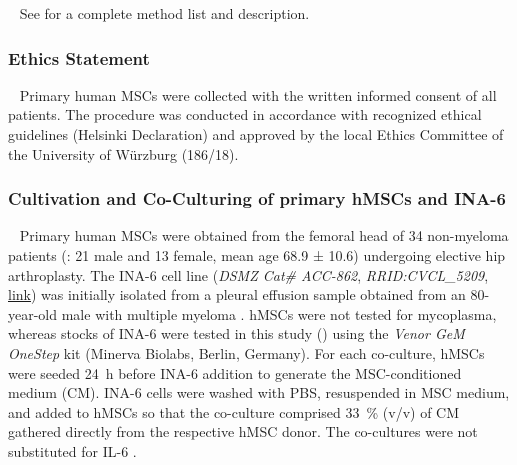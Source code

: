 \newpage


\label{C1:methods}
\ %
See  for a complete method list and description.


\subsubsection*{Ethics Statement}
\ %
Primary human MSCs were collected with the written informed consent of all
 patients. The procedure was conducted in accordance with recognized ethical
 guidelines (Helsinki Declaration) and approved by the local Ethics Committee of
 the University of Würzburg (186/18).

 
 
\subsubsection*{Cultivation and Co-Culturing of primary hMSCs and INA-6}
\ %
Primary human MSCs were obtained from the femoral head of 34 non-myeloma
patients (: 21 male and 13 female, mean age
68.9 ± 10.6) undergoing elective hip arthroplasty. The INA-6 cell line
(\textit{DSMZ Cat\# ACC-862}, \textit{RRID:CVCL\_5209},
\href{https://www.cellosaurus.org/CVCL_5209}{link}) was initially isolated from
a pleural effusion sample obtained from an 80-year-old male with multiple
myeloma \cite{burgerGp130RasMediated2001c,gramatzkiTwoNewInterleukin61994}.
hMSCs were not tested for mycoplasma, whereas stocks of INA-6 were tested in
this study () using the \textit{Venor GeM OneStep} kit
(Minerva Biolabs, Berlin, Germany). For each co-culture, hMSCs were seeded
\SI{24}{\hour} before INA-6 addition to generate the MSC-conditioned medium
(CM). INA-6 cells were washed with PBS, resuspended in MSC medium, and added to
hMSCs so that the co-culture comprised \SI{33}{\percent} (v/v) of CM gathered
directly from the respective hMSC donor. The co-cultures were not substituted
for IL-6 \cite{chatterjeePresenceBoneMarrow2002}.




